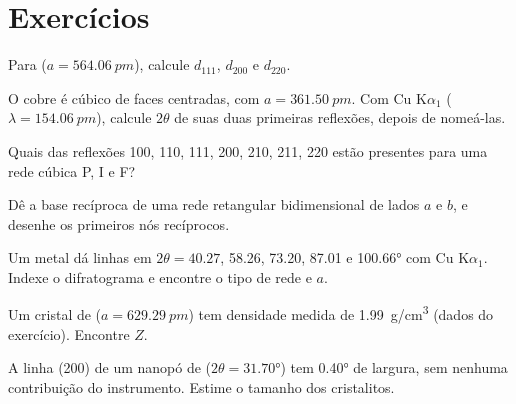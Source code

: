 \section{Exercícios}

\begin{exercise}[$\star$]\label{exo:b3:x-ray-diffraction:1}
Para  ($a = \qty{564.06}{pm}$), calcule $d_{111}$, $d_{200}$ e $d_{220}$.
\end{exercise}

\begin{exercise}[$\star$]\label{exo:b3:x-ray-diffraction:2}
O cobre é cúbico de faces centradas, com $a = \qty{361.50}{pm}$. Com Cu K$\alpha_1$ ($\lambda = \qty{154.06}{pm}$),
calcule $2\theta$ de suas duas primeiras reflexões, depois de nomeá-las.
\end{exercise}

\begin{exercise}[$\star$]\label{exo:b3:x-ray-diffraction:3}
Quais das reflexões 100, 110, 111, 200, 210, 211, 220 estão presentes para uma
rede cúbica P, I e F?
\end{exercise}

\begin{exercise}[$\star$]\label{exo:b3:x-ray-diffraction:4}
Dê a base recíproca de uma rede retangular bidimensional de lados
$a$ e $b$, e desenhe os primeiros nós recíprocos.
\end{exercise}

\begin{exercise}[$\star\star$]\label{exo:b3:x-ray-diffraction:5}
Um metal dá linhas em $2\theta = 40.27$, 58.26, 73.20, 87.01 e \ang{100.66} com Cu
K$\alpha_1$. Indexe o difratograma e encontre o tipo de rede e $a$.
\end{exercise}

\begin{exercise}[$\star\star$]\label{exo:b3:x-ray-diffraction:6}
Um cristal de  ($a = \qty{629.29}{pm}$) tem densidade medida de
\qty{1.99}{g/cm^3} (dados do exercício). Encontre $Z$.
\end{exercise}

\begin{exercise}[$\star\star$]\label{exo:b3:x-ray-diffraction:7}
A linha (200) de um nanopó de  ($2\theta = \ang{31.70}$) tem \ang{0.40} de largura,
sem nenhuma contribuição do instrumento. Estime o tamanho dos cristalitos.
\end{exercise}

